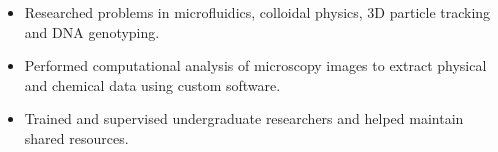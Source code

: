 \documentclass[10pt]{article}
\begin{document}
\begin{itemize}\setlength{\itemsep}{0cm}
  \setlength{\parskip}{0cm}

\item Researched problems in microfluidics, colloidal physics, 3D particle tracking and DNA genotyping.

\item Performed computational analysis of microscopy images to extract physical and chemical data using custom software.






\item Trained and supervised undergraduate researchers and helped maintain shared resources. 







\end{itemize}
\end{document}
